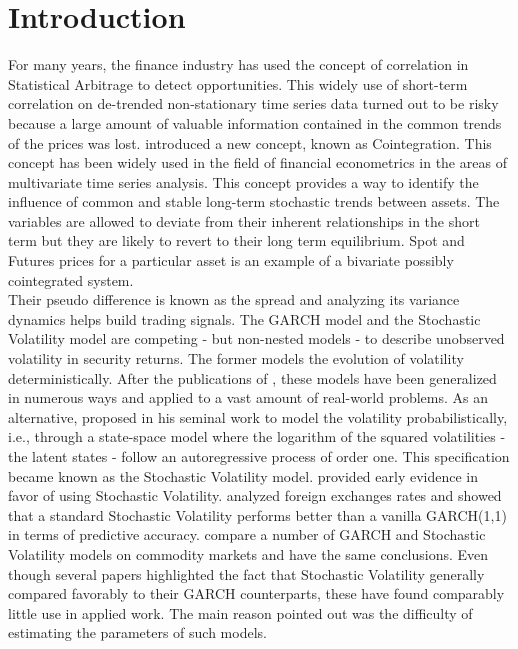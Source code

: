 \documentclass[11pt,a4,twosided,singlespacing,titlepagenumber=on]{scrreprt}
\numberwithin{equation}{chapter} %
\theoremstyle{remark}
\begin{document}
\chapter{Introduction}

For many years, the finance industry has used the concept of correlation in Statistical Arbitrage to detect opportunities. This widely use of short-term correlation on de-trended non-stationary time series data turned out to be risky because a large amount of valuable information contained in the common trends of the prices was lost. \cite{engle1987} introduced a new concept, known as Cointegration. This concept has been widely used in the field of financial econometrics in the areas of multivariate time series analysis. This concept provides a way to identify the influence of common and stable long-term stochastic trends between assets. The variables are allowed to deviate from their inherent relationships in the short term but they are likely to revert to their long term equilibrium. Spot and Futures prices for a particular asset is an example of a bivariate possibly cointegrated system. \\

Their pseudo difference is known as the spread and analyzing its variance dynamics helps build trading signals. The GARCH model and the Stochastic Volatility model are competing - but non-nested models - to describe unobserved volatility in security returns. The former models the evolution of volatility deterministically. After the publications of \cite{engle1986}, these models have been generalized in numerous ways and applied to a vast amount of real-world problems. As an alternative, \cite{taylor1982} proposed in his seminal work to model the volatility probabilistically, i.e., through a state-space model where the logarithm of the squared volatilities - the latent states - follow an autoregressive process of order one. This specification became known as the Stochastic Volatility model. \cite{kim1998} provided early evidence in favor of using Stochastic Volatility. \cite{kastner2014} analyzed foreign exchanges rates and showed that a standard Stochastic Volatility performs better than a vanilla GARCH(1,1) in terms of predictive accuracy. \cite{chan2015} compare a number of GARCH and Stochastic Volatility models on commodity markets and have the same conclusions. Even though several papers highlighted the fact that Stochastic Volatility generally compared favorably to their GARCH counterparts, these have found comparably little use in applied work. The main reason pointed out was the difficulty of estimating the parameters of such models. \\
\end{document}

